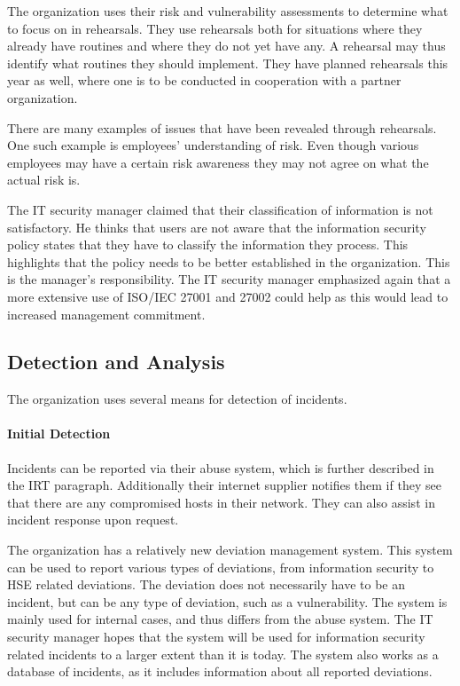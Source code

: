 The organization uses their risk and vulnerability assessments to determine what to focus on in rehearsals. They use rehearsals both for situations where they already have routines and where they do not yet have any. A rehearsal may thus identify what routines they should implement. They have planned rehearsals this year as well, where one is to be conducted in cooperation with a partner organization. 

There are many examples of issues that have been revealed through rehearsals. One such example is employees' understanding of risk. Even though various employees may have a certain risk awareness they may not agree on what the actual risk is. 

The IT security manager claimed that their classification of information is not satisfactory. He thinks that users are not aware that the information security policy states that they have to classify the information they process. This highlights that the policy needs to be better established in the organization. This is the manager's responsibility. The IT security manager emphasized again that a more extensive use of \acs{ISO}/\acs{IEC} 27001 and 27002 could help as this would lead to increased management commitment.

\subsection{Detection and Analysis}
The organization uses several means for detection of incidents.

\paragraph{Initial Detection}
Incidents can be reported via their abuse system, which is further described in the \ac{IRT} paragraph. Additionally their internet supplier notifies them if they see that there are any compromised hosts in their network. They can also assist in incident response upon request.

The organization has a relatively new deviation management system. This system can be used to report various types of deviations, from information security to \ac{HSE} related deviations. The deviation does not necessarily have to be an incident, but can be any type of deviation, such as a vulnerability. The system is mainly used for internal cases, and thus differs from the abuse system. The IT security manager hopes that the system will be used for information security related incidents to a larger extent than it is today. The system also works as a database of incidents, as it includes information about all reported deviations.  

